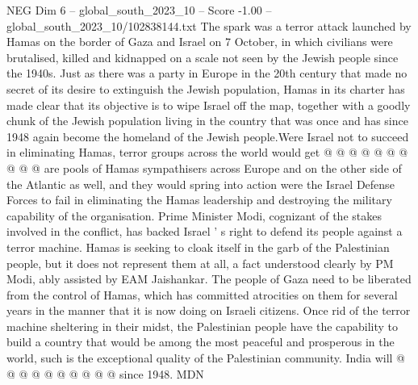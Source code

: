 \begin{textsample}{NEG Dim 6 – global\_south\_2023\_10 – Score -1.00 – global\_south\_2023\_10/102838144.txt}
The spark was a terror attack launched by Hamas on the border of Gaza and Israel on 7 October, in which civilians were brutalised, killed and kidnapped on a scale not seen by the Jewish people since the 1940s.
Just as there was a party in Europe in the 20th century that made no secret of its desire to extinguish the Jewish population, Hamas in its charter has made clear that its objective is to wipe Israel off the map, together with a goodly chunk of the Jewish population living in the country that was once and has since 1948 again become the homeland of the Jewish people.Were Israel not to succeed in eliminating Hamas, terror groups across the world would get @ @ @ @ @ @ @ @ @ @ are pools of Hamas sympathisers across Europe and on the other side of the Atlantic as well, and they would spring into action were the Israel Defense Forces to fail in eliminating the Hamas leadership and destroying the military capability of the organisation.
Prime Minister Modi, cognizant of the stakes involved in the conflict, has backed Israel ' s right to defend its people against a terror machine.
Hamas is seeking to cloak itself in the garb of the Palestinian people, but it does not represent them at all, a fact understood clearly by PM Modi, ably assisted by EAM Jaishankar.
The people of Gaza need to be liberated from the control of Hamas, which has committed atrocities on them for several years in the manner that it is now doing on Israeli citizens.
Once rid of the terror machine sheltering in their midst, the Palestinian people have the capability to build a country that would be among the most peaceful and prosperous in the world, such is the exceptional quality of the Palestinian community.
India will @ @ @ @ @ @ @ @ @ @ since 1948.
MDN

\end{textsample}
